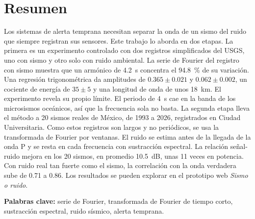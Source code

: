 \documentclass[11pt,letterpaper]{article}
\begin{document}
\section*{Resumen}
Los sistemas de alerta temprana necesitan separar la onda de un sismo del ruido que siempre registran sus sensores. Este trabajo lo aborda en dos etapas. La primera es un experimento controlado con dos registros simplificados del USGS, uno con sismo y otro solo con ruido ambiental. La serie de Fourier del registro con sismo muestra que un armónico de \SI{4.2}{s} concentra el \SI{94.8}{\percent} de su variación. Una regresión trigonométrica da amplitudes de $0.365 \pm 0.021$ y $0.062 \pm 0.002$, un cociente de energía de $35 \pm 5$ y una longitud de onda de unos \SI{18}{km}. El experimento revela su propio límite. El periodo de \SI{4}{s} cae en la banda de los microsismos oceánicos, así que la frecuencia sola no basta. La segunda etapa lleva el método a 20 sismos reales de México, de 1993 a 2026, registrados en Ciudad Universitaria. Como estos registros son largos y no periódicos, se usa la transformada de Fourier por ventanas. El ruido se estima antes de la llegada de la onda P y se resta en cada frecuencia con sustracción espectral. La relación señal-ruido mejora en los 20 sismos, en promedio \SI{10.5}{dB}, unas 11 veces en potencia. Con ruido real tan fuerte como el sismo, la correlación con la onda verdadera sube de 0.71 a 0.86. Los resultados se pueden explorar en el prototipo web \textit{Sismo o ruido}.

\textbf{Palabras clave:} serie de Fourier, transformada de Fourier de tiempo corto, sustracción espectral, ruido sísmico, alerta temprana.
\end{document}
